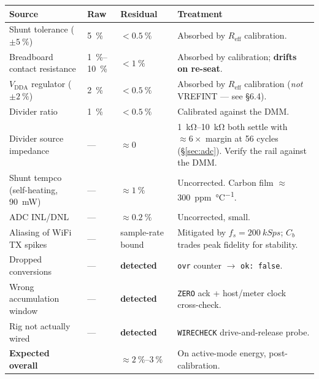 \documentclass[11pt,a4paper]{article}
\begin{document}
\begin{center}
\begin{tabularx}{\textwidth}{Xllp{58mm}}
\toprule
\textbf{Source} & \textbf{Raw} & \textbf{Residual} & \textbf{Treatment} \\
\midrule
Shunt tolerance ($\pm\SI{5}{\percent}$)      & \SI{5}{\percent}   & $<\SI{0.5}{\percent}$ & Absorbed by $R_\text{eff}$ calibration. \\
Breadboard contact resistance                 & \SIrange{1}{10}{\percent} & $<\SI{1}{\percent}$ & Absorbed by calibration; \textbf{drifts on re-seat}. \\
$V_\text{DDA}$ regulator ($\pm\SI{2}{\percent}$) & \SI{2}{\percent} & $<\SI{0.5}{\percent}$ & Absorbed by $R_\text{eff}$ calibration (\emph{not} VREFINT --- see \S6.4). \\
Divider ratio                                 & \SI{1}{\percent}   & $<\SI{0.5}{\percent}$ & Calibrated against the DMM. \\
Divider source impedance                      & ---                & $\approx 0$        & \SIrange{1}{10}{\kilo\ohm} both settle with $\approx6\times$ margin at \num{56} cycles (\S\ref{sec:adc}). Verify the rail against the DMM. \\
Shunt tempco (self-heating, \SI{90}{\milli\watt}) & --- & $\approx\SI{1}{\percent}$ & Uncorrected. Carbon film $\approx$\SI{300}{ppm\per\celsius}. \\
ADC INL/DNL                                   & ---                & $\approx\SI{0.2}{\percent}$ & Uncorrected, small. \\
Aliasing of WiFi TX spikes                    & ---                & sample-rate bound & Mitigated by $f_s=\SI{200}{kSps}$; $C_b$ trades peak fidelity for stability. \\
Dropped conversions                           & ---                & \textbf{detected} & \texttt{ovr} counter $\rightarrow$ \texttt{ok: false}. \\
Wrong accumulation window                     & ---                & \textbf{detected} & \texttt{ZERO} ack + host/meter clock cross-check. \\
Rig not actually wired                        & ---                & \textbf{detected} & \texttt{WIRECHECK} drive-and-release probe. \\
\midrule
\textbf{Expected overall} & & $\approx\SIrange{2}{3}{\percent}$ & On active-mode energy, post-calibration. \\
\bottomrule
\end{tabularx}
\end{center}
\end{document}
